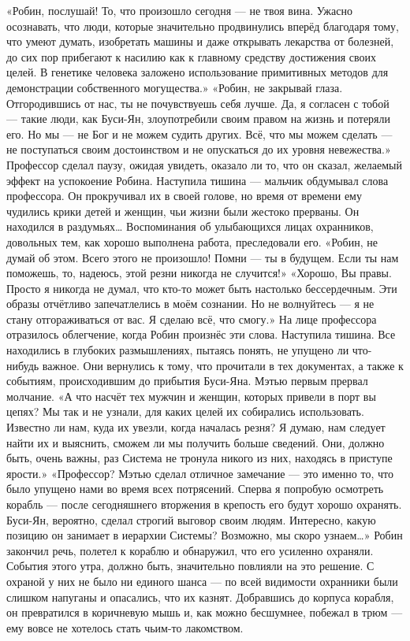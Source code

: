 \documentclass[a4paper,12pt]{book}
\begin{document}
	«Робин, послушай! То, что произошло сегодня — не твоя вина. Ужасно осознавать, что люди, которые значительно продвинулись вперёд благодаря тому, что умеют думать, изобретать машины и даже открывать лекарства от болезней, до сих пор прибегают к насилию как к главному средству достижения своих целей. В генетике человека заложено использование примитивных методов для демонстрации собственного могущества.»
	«Робин, не закрывай глаза. Отгородившись от нас, ты не почувствуешь себя лучше. Да, я согласен с тобой — такие люди, как Буси-Ян, злоупотребили своим правом на жизнь и потеряли его. Но мы — не Бог и не можем судить других. Всё, что мы можем сделать — не поступаться своим достоинством и не опускаться до их уровня невежества.»
	Профессор сделал паузу, ожидая увидеть, оказало ли то, что он сказал, желаемый эффект на успокоение Робина.
	Наступила тишина — мальчик обдумывал слова профессора. Он прокручивал их в своей голове, но время от времени ему чудились крики детей и женщин, чьи жизни были жестоко прерваны.
	Он находился в раздумьях… Воспоминания об улыбающихся лицах охранников, довольных тем, как хорошо выполнена работа, преследовали его.
	«Робин, не думай об этом. Всего этого не произошло! Помни — ты в будущем. Если ты нам поможешь, то, надеюсь, этой резни никогда не случится!»
	«Хорошо, Вы правы. Просто я никогда не думал, что кто-то может быть настолько бессердечным. Эти образы отчётливо запечатлелись в моём сознании. Но не волнуйтесь — я не стану отгораживаться от вас. Я сделаю всё, что смогу.»
	На лице профессора отразилось облегчение, когда Робин произнёс эти слова.
	Наступила тишина. Все находились в глубоких размышлениях, пытаясь понять, не упущено ли что-нибудь важное. Они вернулись к тому, что прочитали в тех документах, а также к событиям, происходившим до прибытия Буси-Яна.
	Мэтью первым прервал молчание.
	«А что насчёт тех мужчин и женщин, которых привели в порт вы цепях? Мы так и не узнали, для каких целей их собирались использовать. Известно ли нам, куда их увезли, когда началась резня? Я думаю, нам следует найти их и выяснить, сможем ли мы получить больше сведений. Они, должно быть, очень важны, раз Система не тронула никого из них, находясь в приступе ярости.»
	«Профессор? Мэтью сделал отличное замечание — это именно то, что было упущено нами во время всех потрясений. Сперва я попробую осмотреть корабль — после сегодняшнего вторжения в крепость его будут хорошо охранять. Буси-Ян, вероятно, сделал строгий выговор своим людям. Интересно, какую позицию он занимает в иерархии Системы? Возможно, мы скоро узнаем…»
	Робин закончил речь, полетел к кораблю и обнаружил, что его усиленно охраняли. События этого утра, должно быть, значительно повлияли на это решение. С охраной у них не было ни единого шанса — по всей видимости охранники были слишком напуганы и опасались, что их казнят. Добравшись до корпуса корабля, он превратился в коричневую мышь и, как можно бесшумнее, побежал в трюм — ему вовсе не хотелось стать чьим-то лакомством.
\end{document}
